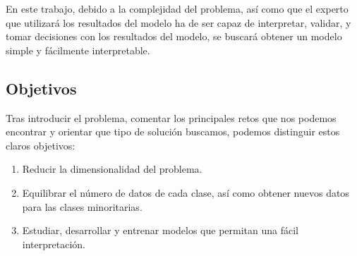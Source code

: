 En este trabajo, debido a la complejidad del problema, así como que el experto que utilizará los resultados del modelo ha de ser capaz de interpretar, validar, y tomar decisiones con los resultados del modelo, se buscará obtener un modelo simple y fácilmente interpretable.


\subsection{Objetivos}

Tras introducir el problema, comentar los principales retos que nos podemos encontrar y orientar que tipo de solución buscamos, podemos distinguir estos claros objetivos:

\begin{enumerate}
	\item Reducir la dimensionalidad del problema.
	\item Equilibrar el número de datos de cada clase, así como obtener nuevos datos para las clases minoritarias.
	\item Estudiar, desarrollar y entrenar modelos que permitan una fácil interpretación.
\end{enumerate}


\newpage
